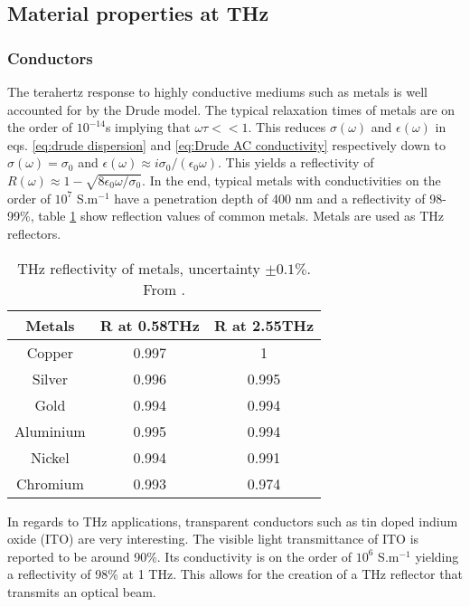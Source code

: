 \subsection{Material properties at THz}

\subsubsection{Conductors}
The terahertz response to highly conductive mediums such as metals is well accounted for by the Drude model. The typical relaxation times of metals are on the order of $10^{-14}$s implying that $\omega \tau <<1$. This reduces $\sigma(\omega)$ and $\epsilon(\omega)$ in eqs. \eqref{eq:drude dispersion} and \eqref{eq:Drude AC conductivity} respectively down to $\sigma(\omega)=\sigma_0$ and $\epsilon(\omega) \approx i \sigma_0/( \epsilon_0 \omega)$. This yields a reflectivity of $R(\omega)\approx1-\sqrt{8\epsilon_0\omega/\sigma_0}$. In the end, typical metals with conductivities on the order of $10^{7}$ S.m$^{-1}$ have a penetration depth of 400 nm and a reflectivity of 98-99\%, table \ref{tab:Metal reflectivity} show reflection values of common metals. Metals are used as THz reflectors.
\begin{table}[h!]
\caption{THz reflectivity of metals, uncertainty $\pm0.1\%$. From \cite{MaterialsatTHz}. }
\centering
\begin{tabular} {c c c}
\hline\hline
Metals & R at 0.58THz & R at 2.55THz\\
\hline
Copper & 0.997 & 1\\
Silver & 0.996 & 0.995\\
Gold & 0.994 & 0.994\\
Aluminium & 0.995 & 0.994\\
Nickel & 0.994 & 0.991\\
Chromium & 0.993 & 0.974\\
\hline
\end{tabular}
\label{tab:Metal reflectivity}
\end{table}


In regards to THz applications, transparent conductors such as tin doped indium oxide (ITO) are very interesting. The visible light transmittance of ITO is reported to be around 90\%. Its conductivity is on the order of $10^6$ S.m$^{-1}$ yielding a reflectivity of 98\% at 1 THz. This allows for the creation of a THz reflector that transmits an optical beam.


